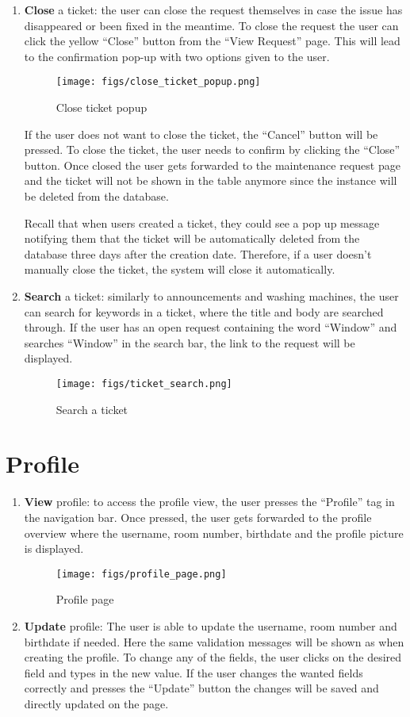 \documentclass[conference]{IEEEtran}
\begin{document}
\begin{enumerate}
    \item \textbf{Close} a ticket: the user can close the request themselves in case the issue has disappeared or been fixed in the meantime. To close the request the user can click the yellow “Close” button from the “View Request” page. This will lead to the confirmation pop-up with two options given to the user.
    \begin{figure}[H]
    \centering
    \texttt{[image: figs/close\_ticket\_popup.png]}
    \caption{Close ticket popup}
    \label{fig:Close ticket popup}
    \end{figure}
    If the user does not want to close the ticket, the “Cancel” button will be pressed. To close the ticket, the user needs to confirm by clicking the “Close” button. Once closed the user gets forwarded to the maintenance request page and the ticket will not be shown in the table anymore since the instance will be deleted from the database.
    
    Recall that when users created a ticket, they could see a pop up message notifying them that the ticket will be automatically deleted from the database three days after the creation date. Therefore, if a user doesn’t manually close the ticket, the system will close it automatically.
    \item \textbf{Search} a ticket: similarly to announcements and washing machines, the user can search for keywords in a ticket, where the title and body are searched through. If the user has an open request containing the word “Window” and searches “Window” in the search bar, the link to the request will be displayed.
    \begin{figure}[H]
    \centering
    \texttt{[image: figs/ticket\_search.png]}
    \caption{Search a ticket}
    \label{fig:Search a ticket}
    \end{figure}
\end{enumerate}
\section{Profile}
\begin{enumerate}
    \item \textbf{View} profile: to access the profile view, the user presses the “Profile” tag in the navigation bar. Once pressed, the user gets forwarded to the profile overview where the username, room number, birthdate and the profile picture is displayed.
    \begin{figure}[H]
    \centering
    \texttt{[image: figs/profile\_page.png]}
    \caption{Profile page}
    \label{fig:Profile page}
    \end{figure}
    \item \textbf{Update} profile: The user is able to update the username, room number and birthdate if needed. Here the same validation messages will be shown as when creating the profile. To change any of the fields, the user clicks on the desired field and types in the new value. If the user changes the wanted fields correctly and presses the “Update” button the changes will be saved and directly updated on the page.
\end{enumerate}
\end{document}

